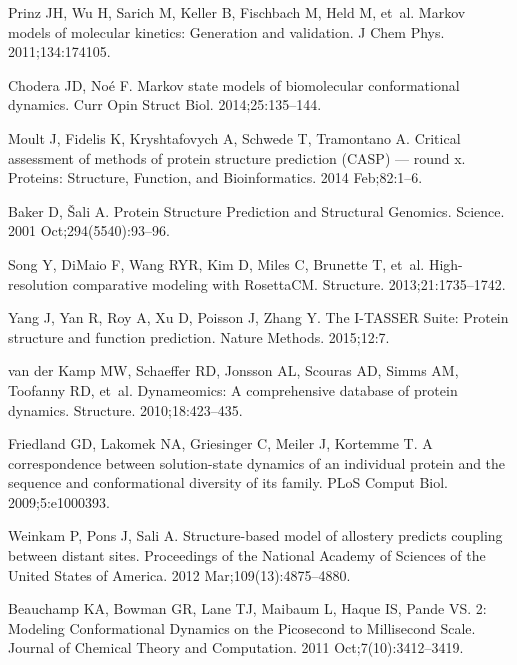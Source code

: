 \documentclass[10pt,letterpaper]{article}
\begin{document}
\begin{thebibliography}{100}
Prinz JH, Wu H, Sarich M, Keller B, Fischbach M, Held M, et~al.
\newblock Markov models of molecular kinetics: Generation and validation.
\newblock J Chem Phys. 2011;134:174105.

Chodera JD, No\'{e} F.
\newblock Markov state models of biomolecular conformational dynamics.
\newblock Curr Opin Struct Biol. 2014;25:135--144.

Moult J, Fidelis K, Kryshtafovych A, Schwede T, Tramontano A.
\newblock Critical assessment of methods of protein structure prediction
  ({CASP}) — round x.
\newblock Proteins: Structure, Function, and Bioinformatics. 2014 Feb;82:1--6.

Baker D, {\v{S}ali} A.
\newblock Protein {Structure} {Prediction} and {Structural} {Genomics}.
\newblock Science. 2001 Oct;294(5540):93--96.

Song Y, {DiMaio} F, Wang RYR, Kim D, Miles C, Brunette T, et~al.
\newblock High-resolution comparative modeling with {RosettaCM}.
\newblock Structure. 2013;21:1735--1742.

Yang J, Yan R, Roy A, Xu D, Poisson J, Zhang Y.
\newblock The {I-TASSER Suite}: Protein structure and function prediction.
\newblock Nature Methods. 2015;12:7.

{van der Kamp} MW, Schaeffer RD, Jonsson AL, Scouras AD, Simms AM, Toofanny RD,
  et~al.
\newblock Dynameomics: A comprehensive database of protein dynamics.
\newblock Structure. 2010;18:423--435.

Friedland GD, Lakomek NA, Griesinger C, Meiler J, Kortemme T.
\newblock A correspondence between solution-state dynamics of an individual
  protein and the sequence and conformational diversity of its family.
\newblock PLoS Comput Biol. 2009;5:e1000393.

Weinkam P, Pons J, Sali A.
\newblock Structure-based model of allostery predicts coupling between distant
  sites.
\newblock Proceedings of the National Academy of Sciences of the United States
  of America. 2012 Mar;109(13):4875--4880.

Beauchamp KA, Bowman GR, Lane TJ, Maibaum L, Haque IS, Pande VS.
2: {Modeling} {Conformational} {Dynamics} on the
  {Picosecond} to {Millisecond} {Scale}.
\newblock Journal of Chemical Theory and Computation. 2011
  Oct;7(10):3412--3419.


\end{thebibliography}
\end{document}
